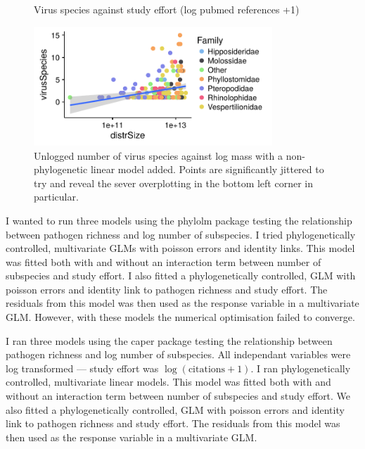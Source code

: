 \begin{knitrout}
\begin{figure}[t]
{}

\caption[Virus species against study effort (log pubmed references +1)]{Virus species against study effort (log pubmed references +1)}\label{fig:subsDataviz}
\end{figure}

\begin{figure}[t]

{\centering \includegraphics[width=0.8\textwidth]{figure/subsDataviz-6} 

}

\caption[Unlogged number of virus species against log mass with a non-phylogenetic linear model added]{Unlogged number of virus species against log mass with a non-phylogenetic linear model added. Points are significantly jittered to try and reveal the sever overplotting in the bottom left corner in particular.}\label{fig:subsDataviz}
\end{figure}


\end{knitrout}


I wanted to run three models using the phylolm package testing the relationship between pathogen richness and log number of subspecies.
I tried phylogenetically controlled, multivariate GLMs with poisson errors and identity links.
This model was fitted both with and without an interaction term between number of subspecies and study effort.
I also fitted a phylogenetically controlled, GLM with poisson errors and identity link to pathogen richness and study effort.
The residuals from this model was then used as the response variable in a multivariate GLM.
However, with these models the numerical optimisation failed to converge.

I ran three models using the caper package \cite{caper} testing the relationship between pathogen richness and log number of subspecies.
All independant variables were log transformed --- study effort was $\log(\text{citations} + 1)$.
I ran phylogenetically controlled, multivariate linear models.
This model was fitted both with and without an interaction term between number of subspecies and study effort.
We also fitted a phylogenetically controlled, GLM with poisson errors and identity link to pathogen richness and study effort.
The residuals from this model was then used as the response variable in a multivariate GLM.



